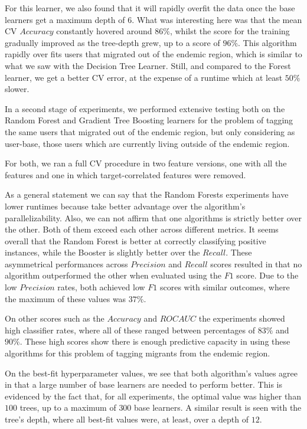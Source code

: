 For this learner, we also found that it will rapidly overfit the data once the base learners get a maximum depth of $6$.
What was interesting here was that the mean CV $Accuracy$ constantly hovered around $86\%$, whilst the score for the training gradually improved as the tree-depth grew, up to a score of $96\%$.
This algorithm rapidly over fits users that migrated out of the endemic region, which is similar to what we saw with the Decision Tree Learner.
Still, and compared to the Forest learner, we get a better CV error, at the expense of a runtime which at least $50\%$ slower.


In a second stage of experiments, we performed extensive testing both on the Random Forest and Gradient Tree Boosting learners for the problem of tagging the same users that migrated out of the endemic region, but only considering as user-base, those users which are currently living outside of the endemic region.

For both, we ran a full CV procedure in two feature versions, one with all the features and one in which target-correlated features were removed.

As a general statement we can say that the Random Forests experiments have lower runtimes because take better advantage over the algorithm's parallelizability.
Also, we can not affirm that one algorithms is strictly better over the other.
Both of them exceed each other across different metrics.
It seems overall that the Random Forest is better at correctly classifying positive instances, while the Booster is slightly better over the $Recall$.
These asymmetrical performances across $Precision$ and $Recall$ scores resulted in that no algorithm outperformed the other when evaluated using the $F1$ score.
Due to the low $Precision$ rates, both achieved low $F1$ scores with similar outcomes, where the maximum of these values was $37\%$.

On other scores such as the $Accuracy$ and $ROC AUC$ the experiments showed high classifier rates, where all of these ranged between percentages of $83\%$ and $90\%$.
These high scores show there is enough predictive capacity in using these algorithms for this problem of tagging migrants from the endemic region.

On the best-fit hyperparameter values, we see that both algorithm's values agree in that a large number of base learners are needed to perform better.
This is evidenced by the fact that, for all experiments, the optimal value was higher than $100$ trees, up to a maximum of $300$ base learners.
A similar result is seen with the tree's depth, where all best-fit values were, at least, over a depth of $12$.


